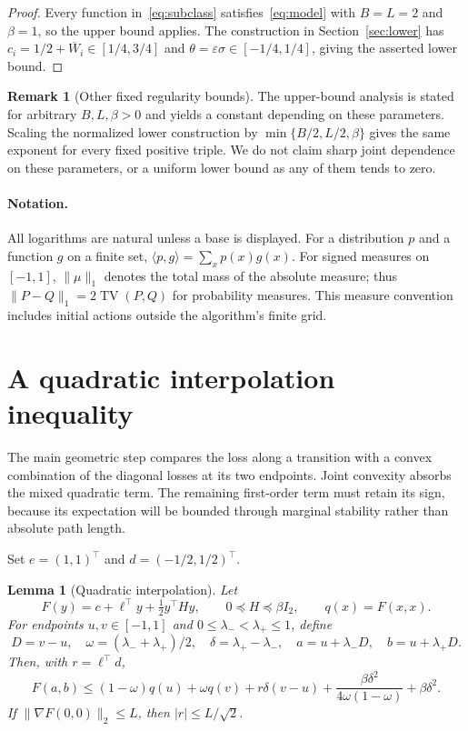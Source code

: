 \documentclass[11pt]{article}
\newtheorem{lemma}[theorem]{Lemma}
\theoremstyle{definition}
\newtheorem{remark}[theorem]{Remark}
\newcommand{\TV}{\operatorname{TV}}
\newcommand{\la}{\langle}
\newcommand{\ra}{\rangle}
\begin{document}
\begin{proof}
Every function in~\eqref{eq:subclass} satisfies~\eqref{eq:model} with $B=L=2$ and $\beta=1$, so the upper bound applies. The construction in Section~\ref{sec:lower} has $c_i=1/2+\overline W_i\in[1/4,3/4]$ and $\theta=\varepsilon\sigma\in[-1/4,1/4]$, giving the asserted lower bound.
\end{proof}

\begin{remark}[Other fixed regularity bounds]
The upper-bound analysis is stated for arbitrary $B,L,\beta>0$ and yields a constant depending on these parameters. Scaling the normalized lower construction by $\min\{B/2,L/2,\beta\}$ gives the same exponent for every fixed positive triple. We do not claim sharp joint dependence on these parameters, or a uniform lower bound as any of them tends to zero.
\end{remark}

\paragraph{Notation.}
All logarithms are natural unless a base is displayed. For a distribution $p$ and a function $g$ on a finite set, $\la p,g\ra=\sum_xp(x)g(x)$. For signed measures on $[-1,1]$, $\|\mu\|_1$ denotes the total mass of the absolute measure; thus $\|P-Q\|_1=2\TV(P,Q)$ for probability measures. This measure convention includes initial actions outside the algorithm's finite grid.

\section{A quadratic interpolation inequality}\label{sec:interpolation}

The main geometric step compares the loss along a transition with a convex combination of the diagonal losses at its two endpoints. Joint convexity absorbs the mixed quadratic term. The remaining first-order term must retain its sign, because its expectation will be bounded through marginal stability rather than absolute path length.

Set $e=(1,1)^\top$ and $d=(-1/2,1/2)^\top$.

\begin{lemma}[Quadratic interpolation]\label{lem:interp}
Let
\[
 F(y)=c+\ell^\top y+\tfrac12y^\top H y,
 \qquad 0\preceq H\preceq\beta I_2,
 \qquad q(x)=F(x,x).
\]
For endpoints $u,v\in[-1,1]$ and $0\leq\lambda_-<\lambda_+\leq1$, define
\[
 D=v-u,\quad \omega=(\lambda_-+\lambda_+)/2,\quad
 \delta=\lambda_+-\lambda_-,\quad
 a=u+\lambda_-D,\quad b=u+\lambda_+D.
\]
Then, with $r=\ell^\top d$,
\begin{equation}\label{eq:interp}
 F(a,b)\leq(1-\omega)q(u)+\omega q(v)+r\delta(v-u)
       +\frac{\beta\delta^2}{4\omega(1-\omega)}+\beta\delta^2.
\end{equation}
If $\|\nabla F(0,0)\|_2\leq L$, then $|r|\leq L/\sqrt2$.
\end{lemma}
\end{document}
